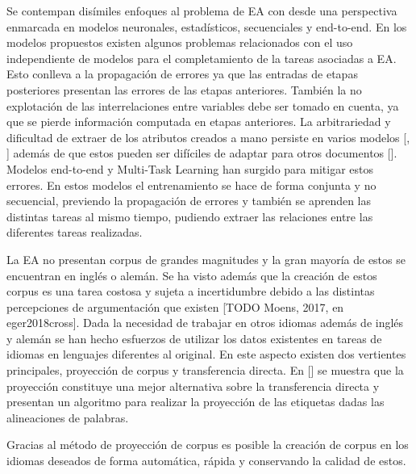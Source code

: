 Se contempan disímiles enfoques al problema de EA con desde una perspectiva enmarcada en modelos neuronales, estadísticos, secuenciales y end-to-end. 
En los modelos propuestos existen algunos problemas relacionados con
el uso independiente de modelos para el completamiento de la tareas asociadas a EA. Esto conlleva a la propagación
de errores ya que las entradas de etapas posteriores presentan las errores de las etapas anteriores.
También la no explotación de las interrelaciones entre variables debe ser tomado en cuenta, ya que se pierde
información computada en etapas anteriores. 
La arbitrariedad y dificultad de extraer de los atributos creados a mano persiste en varios modelos [\cite{goudas2015argument}, \cite{palau2009argumentation}]
además de que estos pueden ser difíciles de adaptar para otros documentos [\cite{eger2017neural}]. Modelos end-to-end y 
Multi-Task Learning han surgido para mitigar estos errores. En estos modelos el entrenamiento se hace de forma 
conjunta y no secuencial, previendo la propagación de errores y también se aprenden las distintas tareas al mismo
tiempo, pudiendo extraer las relaciones entre las diferentes tareas realizadas.


La EA no presentan corpus de grandes magnitudes y la gran mayoría de estos se encuentran en inglés o alemán. 
Se ha visto además que la creación de estos corpus es una tarea costosa y sujeta a incertidumbre debido a las
distintas percepciones de argumentación que existen [TODO Moens, 2017, en eger2018cross]. Dada la necesidad de trabajar en otros idiomas además de
inglés y alemán se han hecho esfuerzos de utilizar los datos existentes en tareas de idiomas en lenguajes 
diferentes al original. En este aspecto existen dos vertientes principales, proyección de corpus y transferencia
directa. En [\cite{eger2018cross}] se muestra que la proyección constituye una mejor alternativa sobre la transferencia
directa y presentan un algoritmo para realizar la proyección de las etiquetas dadas las alineaciones de palabras.

Gracias al método de proyección de corpus es posible la creación de corpus en los idiomas deseados de
forma automática, rápida y conservando la calidad de estos. 




